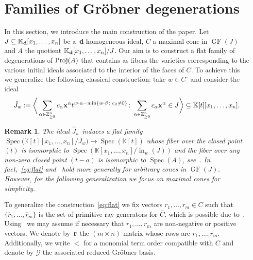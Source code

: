 \documentclass[pdftex]{sigma}%
\newtheorem{Remark}[Theorem]{Remark}}
\numberwithin{equation}{section}
\DeclareMathOperator{\init}{in}
\DeclareMathOperator{\GF}{GF}
\begin{document}
\section{Families of Gr\"obner degenerations}\label{sec:flat families}

In this section, we introduce the main construction of the paper.
Let $J \subseteq \mathbb K_{\bf d}[x_1, \dots , x_n]$ be a~{\bf d}-homogeneous ideal, $C $ a maximal cone in $\GF(J)$ and $A$ the quotient $\mathbb K_{\bf d}[x_1, \dots , x_n]/J$.
Our aim is to construct a flat family of degenerations of ${\rm Proj}(A)$ that contains as fibers the varieties corresponding to the various initial ideals associated to the interior of the faces of $C$.
To achieve this we generalize the following classical construction:
take $w\in C^\circ$ and consider the ideal
\begin{equation}\label{eq:flat}
\hat J_w:=\bigg\langle \sum_{\alpha \in \mathbb Z^n_{\ge 0}} c_\alpha {\bf x}^\alpha t^{w\cdot \alpha -\min\{w\cdot \beta \colon c_\beta \not =0\}} \colon \sum_{\alpha \in \mathbb Z^n_{\ge 0}} c_\alpha {\bf x}^\alpha\in J \bigg\rangle \subseteq \mathbb K[t][x_1,\dots,x_n].
\end{equation}

\begin{Remark}\label{rem:flat}
The ideal $\hat J_w$ induces a flat family $\operatorname{Spec} \big(\mathbb K[t][x_1,\dots,x_n]/\hat J_w\big) \to \operatorname{Spec}(\mathbb{K}[t])$
whose fiber over the closed point $(t)$ is isomorphic to $\operatorname{Spec}(\mathbb K[x_1,\dots,x_n]/\init_w(J))$ and the fiber over any non-zero closed point $ (t-a)$ is isomorphic to $\operatorname{Spec}(A)$, see~\cite[Theorem~15.17]{eisenbud2013commutative}.
In fact,~\eqref{eq:flat} and~\cite[Theorem~15.17]{eisenbud2013commutative} hold more generally for arbitrary cones in $\GF(J)$.
However, for the following generalization we focus on maximal cones for simplicity.
\end{Remark}

To generalize the construction~\eqref{eq:flat} we fix vectors $r_1, \dots , r_m \in C$ such that $\{ \overline{r}_1,\dots, \overline{r}_m \}$ is the set of primitive ray generators for $\overline{C}$, which is possible due to~.
Using~ we may assume if necessary that $r_1,\dots, r_m $ are non-negative or positive vectors.
We denote by~${\bf r}$ the $(m\times n)$-matrix whose rows are $r_1,\dots, r_m$.
Additionally, we write $<$ for a monomial term order compatible with $C$ and denote by $\mathcal G$ the associated reduced Gr\"obner basis.
\end{document}
